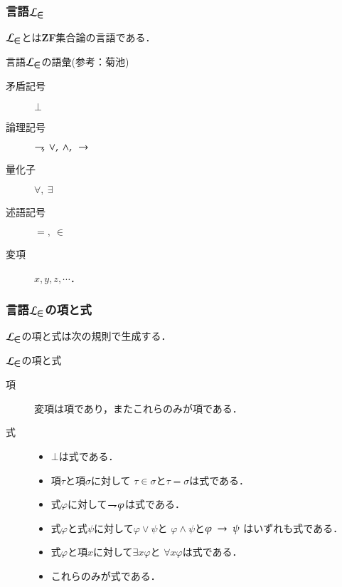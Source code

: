 \documentclass[dvipdfmx,10pt,notheorems]{beamer}
\theoremstyle{definition}
\newcommand{\lang}[1]{\mathcal{L}_{\scalebox{1.2}{$#1$}}} %
\newcommand{\negation}{\rightharpoondown\hspace{-0.25em}} %
\newcommand{\rarrow}{\hspace{0.25em}\rightarrow\hspace{0.25em}} %
\begin{document}
\begin{frame}\frametitle{言語$\lang{\in}$}
		
	
	$\lang{\in}$とは{\bf ZF}集合論の言語である．
	
	\begin{exampleblock}{言語$\lang{\in}$の語彙(参考：菊池\cite{Kikuchi})}
		\begin{description}
			\item[矛盾記号] $\bot$
			\item[論理記号] $\negation,\ \vee,\ \wedge,\ \rarrow$
			\item[量化子] $\forall,\ \exists$
			\item[述語記号] $=,\ \in$
			\item[変項] $x,y,z,\cdots$．
		\end{description}
	\end{exampleblock}
\end{frame}

\begin{frame}\frametitle{言語$\lang{\in}$の項と式}
	$\lang{\in}$の項と式は次の規則で生成する．
	
	\begin{exampleblock}{$\lang{\in}$の項と式}
		\begin{description}
			\item[項] 変項は項であり，またこれらのみが項である．
				
			\item[式] 
				\begin{itemize}
					\item $\bot$は式である．
					\item 項$\tau$と項$\sigma$に対して
						$\tau \in \sigma$と$\tau = \sigma$は式である．
					\item 式$\varphi$に対して$\negation \varphi$は式である．
					\item 式$\varphi$と式$\psi$に対して$\varphi \vee \psi$と
						$\varphi \wedge \psi$と$\varphi \rarrow \psi$
						はいずれも式である．
					\item 式$\varphi$と項$x$に対して$\exists x \varphi$と
						$\forall x \varphi$は式である．
					\item これらのみが式である．
				\end{itemize}
		\end{description}
	\end{exampleblock}
\end{frame}
\end{document}

